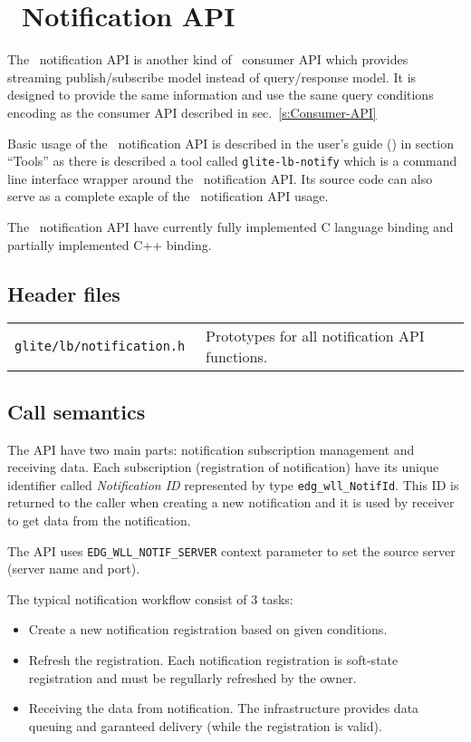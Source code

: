 
\section{\LB\ Notification API}
\label{s:Notification-API}

The \LB\ notification API is another kind of \LB\ consumer API which
provides streaming publish/subscribe model instead of query/response
model. It is designed to provide the same information and use the same
query conditions encoding as the consumer API described in
sec.~\ref{s:Consumer-API}

Basic usage of the \LB\ notification API is described in the \LB
user's guide (\cite{lbug}) in section ``Tools'' as there is described
a tool called \verb'glite-lb-notify' which is a command line interface
wrapper around the \LB\ notification API. Its source code can also
serve as a complete exaple of the \LB\ notification API usage.

The \LB\ notification API have currently fully implemented C language
binding and partially implemented C++ binding.

\subsection{Header files}
\begin{table}[h]
\begin{tabularx}{\textwidth}{>{\tt}lX}
glite/lb/notification.h & Prototypes for all notification API functions. \\
\end{tabularx}
\end{table}

\subsection{Call semantics}
The API have two main parts: notification subscription management and
receiving data. Each subscription (registration of notification) have
its unique identifier called \emph{Notification ID} represented by
type \verb'edg_wll_NotifId'. This ID is returned to the caller when
creating a new notification and it is used by receiver to get data
from the notification.

The API uses \verb'EDG_WLL_NOTIF_SERVER' context parameter to set the
source server (\LB server name and port). 

The typical notification workflow consist of 3 tasks:
\begin{itemize}
 \item Create a new notification registration based on given conditions.
 \item Refresh the registration. Each notification registration is
  soft-state registration and must be regullarly refreshed by the
  owner.
 \item Receiving the data from notification. The \LB infrastructure
  provides data queuing and garanteed delivery (while the registration
  is valid). 
\end{itemize}

